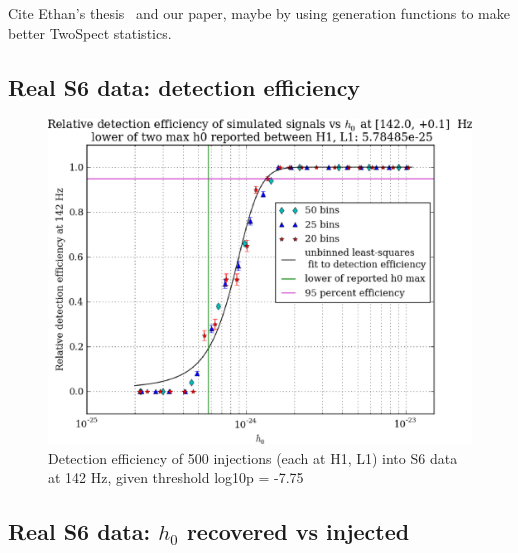             Cite Ethan's thesis~\cite{RomeroThesis} and our paper, maybe by using generation functions to make better TwoSpect statistics.


        \subsection{Real S6 data: detection efficiency}

\begin{figure}
\begin{center}
\includegraphics[width=0.4\paperwidth,height=0.2\paperheight]{plots/detectionEfficiencyh0-142-0Hz.eps}
\caption{Detection efficiency of 500 injections (each at H1, L1) into
S6 data at 142 Hz, given threshold log10p = -7.75}
\end{center}
\end{figure}

        \subsection{Real S6 data: $h_0$ recovered vs injected}

